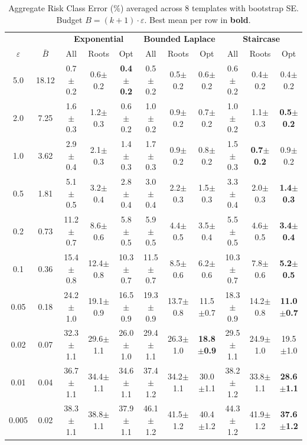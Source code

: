 \providecommand{\pmstd}[1]{{\scriptsize $\pm$#1}}

\begin{table}[t]
\centering
\setlength{\tabcolsep}{2.8pt}
\small
\caption{Aggregate Risk Class Error (\%) averaged across 8 templates with bootstrap SE. Budget $B = (k+1) \cdot \varepsilon$. Best mean per row in \textbf{bold}.}
\label{tab:rq1_kplus1_rce}
\begin{tabular}{cc|ccc|ccc|ccc}
\toprule
& & \multicolumn{3}{c|}{\textbf{Exponential}} & \multicolumn{3}{c|}{\textbf{Bounded Laplace}} & \multicolumn{3}{c}{\textbf{Staircase}} \\
$\varepsilon$ & $\bar{B}$ & All & Roots & Opt & All & Roots & Opt & All & Roots & Opt \\
\midrule
5.0 & 18.12 & 0.7\pmstd{0.2} & 0.6\pmstd{0.2} & \textbf{0.4\pmstd{0.2}} & 0.5\pmstd{0.2} & 0.5\pmstd{0.2} & 0.6\pmstd{0.2} & 0.6\pmstd{0.2} & 0.4\pmstd{0.2} & 0.4\pmstd{0.2} \\
2.0 & 7.25 & 1.6\pmstd{0.3} & 1.2\pmstd{0.3} & 0.6\pmstd{0.2} & 1.0\pmstd{0.2} & 0.9\pmstd{0.2} & 0.7\pmstd{0.2} & 1.0\pmstd{0.2} & 1.1\pmstd{0.3} & \textbf{0.5\pmstd{0.2}} \\
1.0 & 3.62 & 2.9\pmstd{0.4} & 2.1\pmstd{0.3} & 1.4\pmstd{0.3} & 1.7\pmstd{0.3} & 0.9\pmstd{0.2} & 0.8\pmstd{0.2} & 1.5\pmstd{0.3} & \textbf{0.7\pmstd{0.2}} & 0.9\pmstd{0.2} \\
0.5 & 1.81 & 5.1\pmstd{0.5} & 3.2\pmstd{0.4} & 2.8\pmstd{0.4} & 3.0\pmstd{0.4} & 2.2\pmstd{0.3} & 1.5\pmstd{0.3} & 3.3\pmstd{0.4} & 2.0\pmstd{0.3} & \textbf{1.4\pmstd{0.3}} \\
0.2 & 0.73 & 11.2\pmstd{0.7} & 8.6\pmstd{0.6} & 5.8\pmstd{0.5} & 5.9\pmstd{0.5} & 4.4\pmstd{0.5} & 3.5\pmstd{0.4} & 5.5\pmstd{0.5} & 4.6\pmstd{0.5} & \textbf{3.4\pmstd{0.4}} \\
0.1 & 0.36 & 15.4\pmstd{0.8} & 12.4\pmstd{0.8} & 10.3\pmstd{0.7} & 11.5\pmstd{0.7} & 8.5\pmstd{0.6} & 6.2\pmstd{0.6} & 10.3\pmstd{0.7} & 7.8\pmstd{0.6} & \textbf{5.2\pmstd{0.5}} \\
0.05 & 0.18 & 24.2\pmstd{1.0} & 19.1\pmstd{0.9} & 16.5\pmstd{0.9} & 19.3\pmstd{0.9} & 13.7\pmstd{0.8} & 11.5\pmstd{0.7} & 18.3\pmstd{0.9} & 14.2\pmstd{0.8} & \textbf{11.0\pmstd{0.7}} \\
0.02 & 0.07 & 32.3\pmstd{1.1} & 29.6\pmstd{1.1} & 26.0\pmstd{1.0} & 29.4\pmstd{1.1} & 26.3\pmstd{1.0} & \textbf{18.8\pmstd{0.9}} & 29.5\pmstd{1.1} & 24.9\pmstd{1.0} & 19.5\pmstd{1.0} \\
0.01 & 0.04 & 36.7\pmstd{1.1} & 34.4\pmstd{1.1} & 34.6\pmstd{1.1} & 37.4\pmstd{1.2} & 34.2\pmstd{1.1} & 30.0\pmstd{1.1} & 38.2\pmstd{1.2} & 33.8\pmstd{1.1} & \textbf{28.6\pmstd{1.1}} \\
0.005 & 0.02 & 38.3\pmstd{1.1} & 38.8\pmstd{1.1} & 37.9\pmstd{1.1} & 46.1\pmstd{1.2} & 41.5\pmstd{1.2} & 40.4\pmstd{1.2} & 44.3\pmstd{1.2} & 41.9\pmstd{1.2} & \textbf{37.6\pmstd{1.2}} \\
\bottomrule
\end{tabular}
\end{table}
